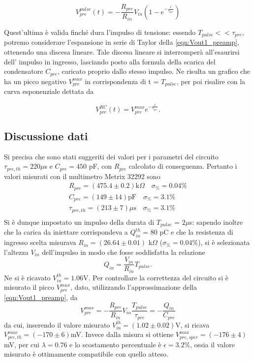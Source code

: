 \documentclass{article}
\begin{document}
\begin{equation}
    \label{eqn:Vout1_preamp}
    V_{pre}^{pulse}(t) = -\frac{R_{pre}}{R_{in}}V_{in}(1-e^{-\frac{t}{\tau_{pre}}})
\end{equation}

Quest'ultima è valida finché dura l'impulso di tensione: essendo $T_{pulse} << \tau_{pre}$, potremo considerare l'espansione in 
serie di Taylor della \ref{eqn:Vout1_preamp}, ottenendo una discesa lineare. Tale discesa lineare si interromperà all'esaurirsi dell'
impulso in ingresso, lasciando posto alla formula della scarica del condensatore $C_{pre}$, caricato proprio dallo stesso impulso.
Ne risulta un grafico che ha un picco negativo $V_{pre}^{max}$ in corrispondenza di t = $T_{pulse}$, per poi risalire con la curva esponenziale
dettata da

\begin{equation}
    \label{eqn:Vout2_preamp}
    V_{pre}^{RC}(t) = V_{pre}^{max}e^{-\frac{t}{\tau_{pre}}}.
\end{equation}

\subsection{Discussione dati}

Si precisa che sono stati suggeriti dei valori per i parametri del circuito $\tau_{pre,th} = 220 \mu$s e $C_{pre} = 450$ pF, con $R_{pre}$ calcolato di 
conseguenza. Pertanto i valori misurati con il multimetro Metrix 32292 sono
\begin{align*}
    R_{pre} = (475.4 \pm 0.2)\text{k}\Omega \quad \sigma_{\%}=0.04 \% \\    
    C_{pre} = (149 \pm 14) \text{pF} \quad \sigma_{\%}=3.1 \%    \\
    \tau_{pre,th} = (213 \pm 7)\mu \text{s} \quad \sigma_{\%}=3.1 \%     \\
\end{align*}
Si è dunque impostato un impulso della durata di $T_{pulse}$ = $2 \mu$s: sapendo inoltre che la carica da iniettare 
corrispondeva a $Q_{in}^{th}$ = 80 pC e che la resistenza di ingresso scelta misurava $R_{in}=(26.64\pm0.01)$ k$\Omega$ ($\sigma_{\%}=0.04\%$), 
si è selezionata l'altezza $V_{in}$ dell'impulso in modo che fosse soddisfatta la relazione
\begin{equation}
    \label{eqn:Qin}
    Q_{in} = \frac{V_{in}}{R_{in}} T_{pulse}.
\end{equation}
Ne si è ricavato $V_{in}^{th} =1.06 $V. Per controllare la correttezza del circuito si è misurato il picco $V_{pre}^{max}$,
dato, utilizzando l'approssimazione della \ref{eqn:Vout1_preamp}, da
\begin{equation}
    \label{eqn:Vpre_max}
    V_{pre}^{max} = -\frac{R_{pre}}{R_{in}} V_{in} \frac{T_{pulse}}{\tau_{pre}} = - \frac{Q_{in}}{C_{pre}}
\end{equation}
da cui, inserendo il valore misurato $V_{in}^{th}=(1.02\pm 0.02) $V, si ricava $V_{pre,th}^{max} =  (-170 \pm 6) $mV. Invece dalla 
misura si ottiene $V_{pre,sper}^{max} = (-176 \pm 4) $mV, per cui $\lambda = 0.76$ e lo scostamento percentuale è $\epsilon = 3.2 \%$, 
ossia il valore misurato è ottimamente compatibile con quello atteso.
\end{document}
